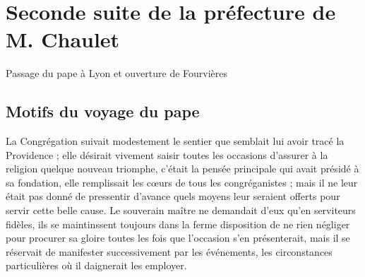 \chapter{Seconde suite de la préfecture de M. Chaulet}
\begin{center}
Passage du pape à Lyon et ouverture de Fourvières
\end{center}

\section*{Motifs du voyage du pape}
La Congrégation suivait modestement le sentier que semblait lui avoir tracé la Providence ; elle désirait vivement saisir toutes les occasions d'assurer à la religion quelque nouveau triomphe, c'était la pensée principale qui avait présidé à sa fondation, elle remplissait les cœurs de tous les congréganistes ; mais il ne leur était pas donné de pressentir d'avance quels moyens leur seraient offerts pour servir cette belle cause. Le souverain maître ne demandait d'eux qu'en serviteurs fidèles, ils se maintinssent toujours dans la ferme disposition de ne rien négliger pour
procurer sa gloire toutes les fois que l'occasion s'en présenterait, mais il se réservait de manifester successivement par les événements, les circonstances particulières où il daignerait les employer.

